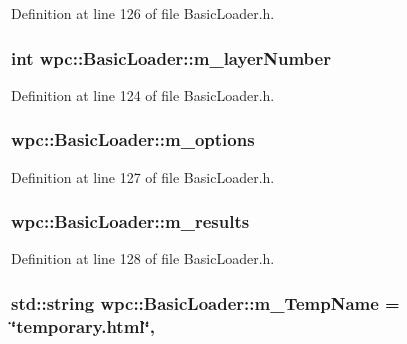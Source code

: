 Definition at line 126 of file Basic\-Loader.\-h.

\hypertarget{classwpc_1_1_basic_loader_a3b78c6d764a8ee7985b7ec471eb9d276}{
\subsubsection[{m\-\_\-layer\-Number}]{\setlength{\rightskip}{0pt plus 5cm}int wpc\-::\-Basic\-Loader\-::m\-\_\-layer\-Number\hspace{0.3cm}{\ttfamily [private]}}}\label{classwpc_1_1_basic_loader_a3b78c6d764a8ee7985b7ec471eb9d276}


Definition at line 124 of file Basic\-Loader.\-h.

\hypertarget{classwpc_1_1_basic_loader_a869f709a80ee7a0c5a47d12c11fc4d14}{
\subsubsection[{m\-\_\-options}]{ wpc\-::\-Basic\-Loader\-::m\-\_\-options\hspace{0.3cm}{\ttfamily [private]}}}\label{classwpc_1_1_basic_loader_a869f709a80ee7a0c5a47d12c11fc4d14}


Definition at line 127 of file Basic\-Loader.\-h.

\hypertarget{classwpc_1_1_basic_loader_a7b03bfcc76578e8a45b1f70495541b72}{
\subsubsection[{m\-\_\-results}]{ wpc\-::\-Basic\-Loader\-::m\-\_\-results\hspace{0.3cm}{\ttfamily [private]}}}\label{classwpc_1_1_basic_loader_a7b03bfcc76578e8a45b1f70495541b72}


Definition at line 128 of file Basic\-Loader.\-h.

\hypertarget{classwpc_1_1_basic_loader_ae160d8e7f8dd2e463ee6ccddc7c34073}{
\subsubsection[{m\-\_\-\-Temp\-Name}]{\setlength{\rightskip}{0pt plus 5cm}std\-::string wpc\-::\-Basic\-Loader\-::m\-\_\-\-Temp\-Name = \char`\"{}temporary.\-html\char`\"{}\hspace{0.3cm}{\ttfamily [static]}, {\ttfamily [private]}}}\label{classwpc_1_1_basic_loader_ae160d8e7f8dd2e463ee6ccddc7c34073}


